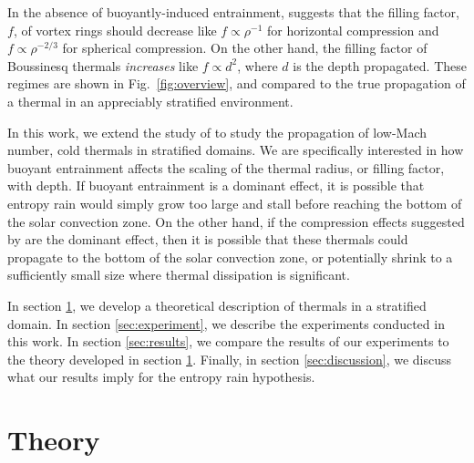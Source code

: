 \documentclass[twocolumn, amsmath, amsfonts, amssymb, trackchanges]{aastex62}
\begin{document}
In the absence of buoyantly-induced entrainment, \citet{brandenburg2016} suggests that the filling factor, $f$, of vortex rings should decrease like $f \propto \rho^{-1}$ for horizontal compression and $f \propto \rho^{-2/3}$ for spherical compression. 
On the other hand, the filling factor of Boussinesq thermals \emph{increases} like $f \propto d^2$, where $d$ is the depth propagated.
These regimes are shown in Fig.~\ref{fig:overview}, and compared to the true propagation of a thermal in an appreciably stratified environment.

In this work, we extend the study of \citet{lecoanet&jeevanjee2018} to study the propagation of low-Mach number, cold thermals in stratified domains. 
We are specifically interested in how buoyant entrainment affects the scaling of the thermal radius, or filling factor, with depth. 
If buoyant entrainment is a dominant effect, it is possible that entropy rain would simply grow too large and stall before reaching the bottom of the solar convection zone.
On the other hand, if the compression effects suggested by \citet{brandenburg2016} are the dominant effect, then it is possible that these thermals could propagate to the bottom of the solar
convection zone, or potentially shrink to a sufficiently small size where thermal dissipation is significant.

In section \ref{sec:theory}, we develop a theoretical description of thermals in a stratified domain. 
In section \ref{sec:experiment}, we describe the experiments conducted in this work. 
In section \ref{sec:results}, we compare the results of our experiments to the theory developed in section \ref{sec:theory}. 
Finally, in section \ref{sec:discussion}, we discuss what our results imply for the entropy rain hypothesis.

\section{Theory}
\label{sec:theory}
\end{document}
